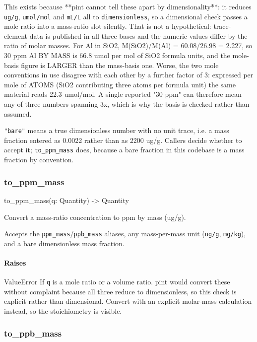 \documentclass[10pt,a4paper,twoside]{report}
\begin{document}
This exists because **pint cannot tell these apart by dimensionality**: it reduces \texttt{ug/g}, \texttt{umol/mol} and \texttt{mL/L} all to \texttt{dimensionless}, so a dimensional check passes a mole ratio into a mass-ratio slot silently. That is not a hypothetical: trace-element data is published in all three bases and the numeric values differ by the ratio of molar masses. For Al in SiO2, M(SiO2)/M(Al) = 60.08/26.98 = 2.227, so 30 ppm Al BY MASS is 66.8 umol per mol of SiO2 formula units, and the mole-basis figure is LARGER than the mass-basis one. Worse, the two mole conventions in use disagree with each other by a further factor of 3: expressed per mole of ATOMS (SiO2 contributing three atoms per formula unit) the same material reads 22.3 umol/mol. A single reported "30 ppm" can therefore mean any of three numbers spanning 3x, which is why the basis is checked rather than assumed.

\texttt{"bare"} means a true dimensionless number with no unit trace, i.e. a mass fraction entered as 0.0022 rather than as 2200 ug/g. Callers decide whether to accept it; \texttt{to\_ppm\_mass} does, because a bare fraction in this codebase is a mass fraction by convention.

\subsubsection*{to\_ppm\_mass}

\begin{verbatimsmall}
to_ppm_mass(q: Quantity) -> Quantity
\end{verbatimsmall}

Convert a mass-ratio concentration to ppm by mass (ug/g).

Accepts the \texttt{ppm\_mass}/\texttt{ppb\_mass} aliases, any mass-per-mass unit (\texttt{ug/g}, \texttt{mg/kg}), and a bare dimensionless mass fraction.

\paragraph*{Raises}

ValueError If \texttt{q} is a mole ratio or a volume ratio. pint would convert these without complaint because all three reduce to dimensionless, so this check is explicit rather than dimensional. Convert with an explicit molar-mass calculation instead, so the stoichiometry is visible.

\subsubsection*{to\_ppb\_mass}
\end{document}
